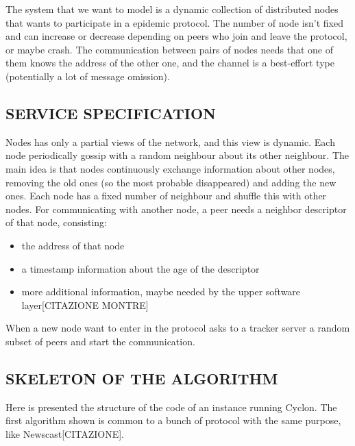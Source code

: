\documentclass[a4paper,12pt,notitlepage]{article} %
\begin{document}
The system that we want to model is a dynamic collection of distributed nodes that wants to participate in
 a epidemic protocol. The number of node isn't fixed and can increase or decrease depending on peers who
 join and leave the protocol, or maybe crash. 
 The communication between pairs of nodes needs that one 
 of them knows the address of the other one, and the channel is a best-effort type (potentially a lot of 
 message omission). 


\subsection{SERVICE SPECIFICATION}

Nodes has only a partial views of the network, and this view is dynamic. Each node periodically 
 gossip with a random neighbour about its other neighbour. The main idea is that nodes continuously
 exchange information about other nodes, removing the old ones (so the most probable disappeared) and
 adding the new ones. Each node has a fixed number of neighbour and shuffle this with other nodes.
 For communicating with another node, a peer needs a neighbor descriptor of that node, consisting:

 \begin{itemize}
 	\item the address of that node
 	\item a timestamp information about the age of the descriptor
 	\item more additional information, maybe needed by the upper software layer[CITAZIONE MONTRE]
 \end{itemize}

When a new node want to enter in the protocol asks to a tracker 
 server a random subset of peers and start the communication.

 \subsection{SKELETON OF THE ALGORITHM}	
Here is presented the structure of the code of an instance running Cyclon. The first algorithm shown 
 is common to a bunch of protocol with the same purpose, like Newscast[CITAZIONE].
\end{document}
